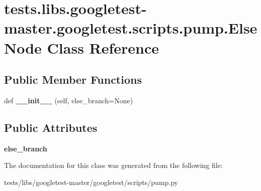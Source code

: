 \hypertarget{classtests_1_1libs_1_1googletest-master_1_1googletest_1_1scripts_1_1pump_1_1ElseNode}{}\section{tests.\+libs.\+googletest-\/master.googletest.\+scripts.\+pump.\+Else\+Node Class Reference}
\label{classtests_1_1libs_1_1googletest-master_1_1googletest_1_1scripts_1_1pump_1_1ElseNode}
\subsection*{Public Member Functions}
\begin{DoxyCompactItemize}
\item 
\mbox{\label{classtests_1_1libs_1_1googletest-master_1_1googletest_1_1scripts_1_1pump_1_1ElseNode_a0b1198c23f0ddd87195802072a46e45b}} 
def {\bfseries \+\_\+\+\_\+init\+\_\+\+\_\+} (self, else\+\_\+branch=None)
\end{DoxyCompactItemize}
\subsection*{Public Attributes}
\begin{DoxyCompactItemize}
\item 
\mbox{\label{classtests_1_1libs_1_1googletest-master_1_1googletest_1_1scripts_1_1pump_1_1ElseNode_a56ca0587f5c6a92dd90d3573446ebb67}} 
{\bfseries else\+\_\+branch}
\end{DoxyCompactItemize}


The documentation for this class was generated from the following file\+:\begin{DoxyCompactItemize}
\item 
tests/libs/googletest-\/master/googletest/scripts/pump.\+py\end{DoxyCompactItemize}
